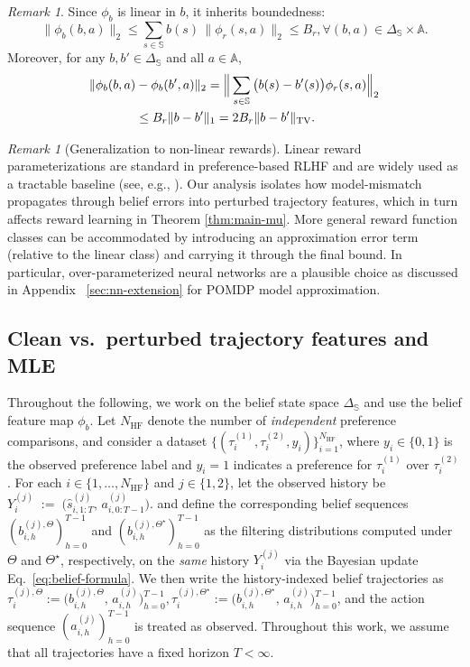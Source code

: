 \documentclass[10pt]{article} %
\theoremstyle{plain}
\theoremstyle{definition}
\theoremstyle{remark}
\newtheorem{remark}[theorem]{Remark}
\newcommand{\bA}{\mathbb{A}}
\newcommand{\bS}{\mathbb{S}}
\begin{document}
\begin{remark}
Since $\phi_b$ is linear in $b$, it inherits boundedness:
\[
\|\phi_b(b,a)\|_2 \le \sum_{s\in\bS} b(s)\,\|\phi_r(s,a)\|_2 \le B_r, \forall (b,a)\in\Delta_{\bS}\times\bA.
\]
Moreover, for any $b,b'\in\Delta_{\bS}$ and all $a\in\bA$,
\begin{align}\label{eq:belief-feature-lip}
\|\phi_b(b,a)&-\phi_b(b',a)\|_2
=\Big\|\sum_{s\in\bS}\big(b(s)-b'(s)\big)\phi_r(s,a)\Big\|_2\notag\\
&\le B_r\|b-b'\|_1
=2B_r\|b-b'\|_{\mathrm{TV}}.
\end{align}
\end{remark}

\begin{remark}[Generalization to non-linear rewards]
Linear reward parameterizations are standard in preference-based RLHF and are widely used as a tractable baseline (see, e.g., \cite{ZhuPrincipledComparisons, Du2024Exploration-DrivenUtilization, cen2025valueincentivized}). 
Our analysis isolates how model-mismatch propagates through belief errors into perturbed trajectory features, which in turn affects reward learning in Theorem \ref{thm:main-mu}. 
More general reward function classes can be accommodated by introducing an approximation error term (relative to the linear class) and carrying it through the final bound. 
In particular, over-parameterized neural networks are a plausible choice as discussed in Appendix ~\ref{sec:nn-extension} for POMDP model approximation.
\end{remark}
 
\subsection{Clean vs.\ perturbed trajectory features and MLE}
\label{subsec:features-mle}

Throughout the following, we work on the belief state space $\Delta_{\bS}$ and use the belief feature map
$\phi_b$. Let $N_{\mathrm{HF}}$ denote the number of \emph{independent} preference comparisons, and consider a dataset
\(
\bigl\{(\tau_i^{(1)},\tau_i^{(2)},y_i)\bigr\}_{i=1}^{N_{\mathrm{HF}}}
\),
where $y_i\in\{0,1\}$ is the observed preference label and $y_i=1$ indicates a preference for $\tau_i^{(1)}$ over $\tau_i^{(2)}$. For each $i\in\{1,\dots,N_{\mathrm{HF}}\}$ and $j\in\{1,2\}$, let the observed history be \(Y_i^{(j)} \;:=\; \bigl(\hat s_{i,1:T}^{(j)},\,a_{i,0:T-1}^{(j)}\bigr).
\) and define the corresponding belief sequences $(b_{i,h}^{(j),\Theta})_{h=0}^{T-1}$ and
$(b_{i,h}^{(j),\Theta^\star})_{h=0}^{T-1}$ as the filtering distributions computed under
$\Theta$ and $\Theta^\star$, respectively, on the \emph{same} history $Y_i^{(j)}$ via the Bayesian update
Eq.~\ref{eq:belief-formula}. We then write the history-indexed belief trajectories as
\(
\tau_i^{(j),\Theta}:=\bigl(b_{i,h}^{(j),\Theta},\,a_{i,h}^{(j)}\bigr)_{h=0}^{T-1}, \tau_i^{(j),\Theta^\star}:=\bigl(b_{i,h}^{(j),\Theta^\star},\,a_{i,h}^{(j)}\bigr)_{h=0}^{T-1}
\), and the action sequence $(a_{i,h}^{(j)})_{h=0}^{T-1}$ is treated as observed. Throughout this work, we assume that all trajectories have a fixed horizon $T<\infty$.
\end{document}
